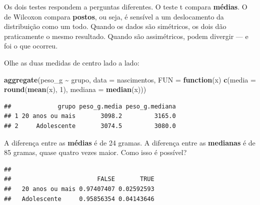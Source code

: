 \documentclass[
]{book}
\newenvironment{Shaded}{\begin{snugshade}}{\end{snugshade}}
\newcommand{\AttributeTok}[1]{\textcolor[rgb]{0.13,0.29,0.53}{#1}}
\newcommand{\CommentTok}[1]{\textcolor[rgb]{0.56,0.35,0.01}{\textit{#1}}}
\newcommand{\ControlFlowTok}[1]{\textcolor[rgb]{0.13,0.29,0.53}{\textbf{#1}}}
\newcommand{\DecValTok}[1]{\textcolor[rgb]{0.00,0.00,0.81}{#1}}
\newcommand{\FunctionTok}[1]{\textcolor[rgb]{0.13,0.29,0.53}{\textbf{#1}}}
\newcommand{\NormalTok}[1]{#1}
\newcommand{\SpecialCharTok}[1]{\textcolor[rgb]{0.81,0.36,0.00}{\textbf{#1}}}
\begin{document}
Os dois testes respondem a perguntas diferentes. O teste t compara \textbf{médias}. O de Wilcoxon compara \textbf{postos}, ou seja, é sensível a um deslocamento da distribuição como um todo. Quando os dados são simétricos, os dois dão praticamente o mesmo resultado. Quando são assimétricos, podem divergir --- e foi o que ocorreu.

Olhe as duas medidas de centro lado a lado:

\begin{Shaded}
\begin{Highlighting}[]
\FunctionTok{aggregate}\NormalTok{(peso\_g }\SpecialCharTok{\textasciitilde{}}\NormalTok{ grupo, }\AttributeTok{data =}\NormalTok{ nascimentos,}
          \AttributeTok{FUN =} \ControlFlowTok{function}\NormalTok{(x) }\FunctionTok{c}\NormalTok{(}\AttributeTok{media =} \FunctionTok{round}\NormalTok{(}\FunctionTok{mean}\NormalTok{(x), }\DecValTok{1}\NormalTok{),}
                              \AttributeTok{mediana =} \FunctionTok{median}\NormalTok{(x)))}
\end{Highlighting}
\end{Shaded}

\begin{verbatim}
##             grupo peso_g.media peso_g.mediana
## 1 20 anos ou mais       3098.2         3165.0
## 2     Adolescente       3074.5         3080.0
\end{verbatim}

A diferença entre as \textbf{médias} é de 24 gramas. A diferença entre as \textbf{medianas} é de 85 gramas, quase quatro vezes maior. Como isso é possível?

\begin{Shaded}
\end{Shaded}

\begin{verbatim}
##                  
##                        FALSE       TRUE
##   20 anos ou mais 0.97407407 0.02592593
##   Adolescente     0.95856354 0.04143646
\end{verbatim}
\end{document}
